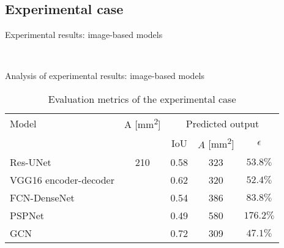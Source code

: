 \documentclass[10pt,aspectratio=169,dvipsnames]{beamer} %
\begin{document}
\subsection{Experimental case}
\setcounter{subfigure}{0}
\begin{frame}{Experimental results: image-based models}
	\centering
	\begin{figure}
		\qquad
		\qquad
		\qquad
		\\
		\qquad
		\qquad
	\end{figure}
\end{frame}
\begin{frame}{Analysis of experimental results: image-based models}
	\begin{table}[!ht]
		\centering
		\caption{Evaluation metrics of the experimental case}
		\label{tab:rms_exp_case}
		\begin{tabular}{l@{\ }cccc}
			\toprule
			\multicolumn{1}{l}{Model} & \multicolumn{1}{c}{A [mm\textsuperscript{2}]} & \multicolumn{3}{c}{Predicted output} \\ 
			\cmidrule(lr){3-5} & & \multicolumn{1}{c}{IoU} & \multicolumn{1}{c}{\(\hat{A}\) [mm\textsuperscript{2}]} & \(\epsilon\) \\ \midrule
			Res-UNet & \multicolumn{1}{c}{210} & \multicolumn{1}{c}{0.58} & \multicolumn{1}{c}{323}  & \(53.8\%\) \\ 
			VGG16 encoder-decoder &  & \multicolumn{1}{c}{0.62} & \multicolumn{1}{c}{320} & \(52.4\%\) 
			\\ 
			FCN-DenseNet &  & \multicolumn{1}{c}{0.54} & \multicolumn{1}{c}{386} & \(83.8\%\) \\ 
			PSPNet &  & \multicolumn{1}{c}{0.49} & \multicolumn{1}{c}{580} & \(176.2\%\) 
			\\ 
			GCN &  & \multicolumn{1}{c}{0.72} & \multicolumn{1}{c}{309} & \(47.1\%\) 
			\\ 
			\bottomrule
		\end{tabular}		
	\end{table}
\end{frame}
\end{document}

